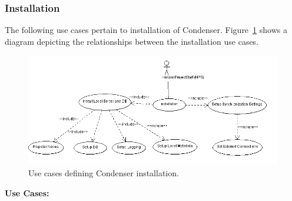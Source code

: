 \subsubsection{Installation}		 
The following use cases pertain to installation of Condenser. Figure~\ref{InstallationUsages} shows a diagram depicting the relationships between the installation use cases.
\begin{center}
	\begin{figure}[htbp]
		\includegraphics[scale=.4]{images/InstallationUse.png}
		\caption{Use cases defining Condenser installation.\label{InstallationUsages}}
	\end{figure}
\end{center}	
\textbf{Use Cases:}\\

